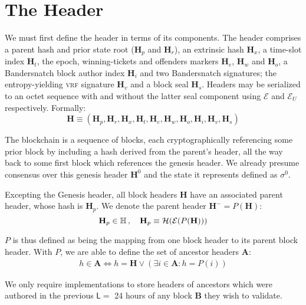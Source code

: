 \section{The Header}\label{sec:header}

We must first define the header in terms of its components. The header comprises a parent hash and prior state root ($\mathbf{H}_p$ and $\mathbf{H}_r$), an extrinsic hash $\mathbf{H}_x$, a time-slot index $\mathbf{H}_t$, the epoch, winning-tickets and offenders markers $\mathbf{H}_e$, $\mathbf{H}_w$ and $\mathbf{H}_o$, a Bandersnatch block author index $\mathbf{H}_i$ and two Bandersnatch signatures; the entropy-yielding \textsc{vrf} signature $\mathbf{H}_v$ and a block seal $\mathbf{H}_s$. Headers may be serialized to an octet sequence with and without the latter seal component using $\mathcal{E}$ and $\mathcal{E}_U$ respectively. Formally:
\begin{equation}\label{eq:header}
  \mathbf{H} \equiv (\mathbf{H}_p, \mathbf{H}_r, \mathbf{H}_x, \mathbf{H}_t, \mathbf{H}_e, \mathbf{H}_w, \mathbf{H}_o, \mathbf{H}_i, \mathbf{H}_v, \mathbf{H}_s)
\end{equation}

The blockchain is a sequence of blocks, each cryptographically referencing some prior block by including a hash derived from the parent's header, all the way back to some first block which references the genesis header. We already presume consensus over this genesis header $\mathbf{H}^0$ and the state it represents defined as $\sigma^0$.

Excepting the Genesis header, all block headers $\mathbf{H}$ have an associated parent header, whose hash is $\mathbf{H}_p$. We denote the parent header $\mathbf{H}^- = P(\mathbf{H})$:
\begin{equation}
  \mathbf{H}_p \in \mathbb{H} \,,\quad \mathbf{H}_p \equiv \mathcal{H}(\mathcal{E}(P(\mathbf{H})))
\end{equation}

$P$ is thus defined as being the mapping from one block header to its parent block header. With $P$, we are able to define the set of ancestor headers $\mathbf{A}$:
\begin{align}\label{eq:ancestors}
  h \in \mathbf{A} \Leftrightarrow h = \mathbf{H} \vee (\exists i \in \mathbf{A} : h = P(i))
\end{align}

We only require implementations to store headers of ancestors which were authored in the previous $\mathsf{L} = $ 24 hours of any block $\mathbf{B}$ they wish to validate.

